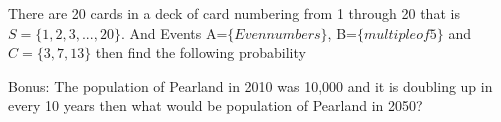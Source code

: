 \documentclass[11pt]{exam}
\begin{document}
\begin{questions}
\begin{parts}
\end{parts}
\vspace{3cm}



\addpoints
\question[6]  There are 20 cards in a deck of card numbering from 1 through 20 that is $S=\{1, 2, 3, ...,20\}$. And Events A=$\{Even numbers\}$, B=$\{multiple of 5\}$ and $C=\{3,7, 13\}$ then find the following probability

Bonus:
\addpoints
\question[5] The population of Pearland in 2010 was 10,000 and it  is doubling up in every 10 years then what would be population of Pearland in 2050?

\end{questions}
\end{document}
